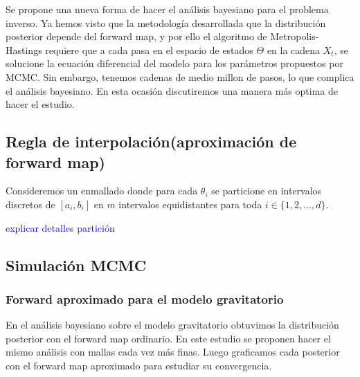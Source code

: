 Se propone una nueva forma de hacer el análisis bayesiano para el problema inverso. Ya hemos visto que la metodología desarrollada que la distribución posterior depende del forward map, y por ello el algoritmo de Metropolis-Hastings requiere que a cada pasa en el espacio de estados $\Theta$ en la cadena $X_t$, se solucione la ecuación diferencial del modelo para los parámetros propuestos por MCMC. Sin embargo, tenemos cadenas de medio millon de pasos, lo que complica el análisis bayesiano. En esta ocasión discutiremos una manera más optima de hacer el estudio.

\subsection{Regla de interpolación(aproximación de forward map)}

Consideremos un enmallado donde para cada $\theta_i$ se particione en intervalos discretos de $[a_i,b_i]$ en $m$ intervalos equidistantes para toda $i \in \{1,2,...,d\}.$ 

\textcolor{blue}{explicar detalles partición}



\subsection{Simulación MCMC}
\subsubsection{Forward aproximado para el modelo gravitatorio}

En el análisis bayesiano sobre el modelo gravitatorio obtuvimos la distribución posterior con el forward map ordinario. En este estudio se proponen hacer el mismo análisis con mallas cada vez más finas. Luego graficamos cada posterior con el forward map aproximado para estudiar su convergencia.



